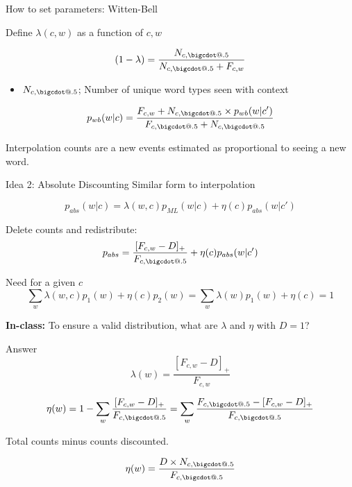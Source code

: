 \documentclass{beamer}
\makeatletter
\newcommand*\bigcdot{\mathpalette\bigcdot@{.5}}
\newcommand*\bigcdot@[2]{\mathbin{\vcenter{\hbox{\scalebox{#2}{$\m@th#1\bullet$}}}}}
\makeatother
\begin{document}
\begin{frame}{How to set parameters:  Witten-Bell}

  Define $\lambda(c, w)$ as a function of $c, w$

  \[(1 - \lambda) =  \frac{\displaystyle N_{c, \bigcdot}} {\displaystyle N_{c, \bigcdot} + F_{c, w}}\]

  \begin{itemize}
  \item $N_{c, \bigcdot}$; Number of unique word types seen with context 
  \end{itemize}

  \[ p_{wb}(w | c) = \frac{\displaystyle F_{c, w} + N_{c, \bigcdot} \times p_{wb}(w| c')} {\displaystyle  F_{c, \bigcdot} + N_{c, \bigcdot}} \]

    Interpolation counts are a new events estimated as proportional to seeing a new word.
\end{frame}

\begin{frame}{Idea 2: Absolute Discounting}
  Similar form to interpolation

  \[ p_{abs}(w |  c) =  \lambda(w,c) p_{ML}(w |  c) + \eta(c) p_{abs}(w | c') \]

  Delete counts and redistribute:
    \[ p_{abs} =\frac{[F_{c,w} - D]_{+}}{F_{c, \bigcdot}} +  \eta(c) p_{abs}(w |  c' )  \]

  Need for a given $c$
  \[\sum_{w} \lambda(w, c)p_1(w) + \eta(c)p_2(w) = \sum_{w} \lambda(w)p_1(w) + \eta(c) = 1\]


  \textbf{In-class:} To ensure a valid distribution, what are $\lambda$  and $\eta$ with $D=1$?
  
\end{frame}

\begin{frame}{Answer}
  \[\lambda(w) = \frac{[F_{c,w} - D]_{+}}{F_{c,w}} \]

  \[\eta(w) = 1 - \sum_w \frac{[F_{c,w} - D]_{+}}{F_{c, \bigcdot}} = \sum_w \frac{F_{c, \bigcdot} - [F_{c,w} - D]_{+}}{F_{c, \bigcdot}} \]

  Total counts minus counts discounted. 

  \[ \eta(w)= \frac{D \times N_{c, \bigcdot}}{F_{c, \bigcdot}} \] 
\end{frame}
\end{document}
